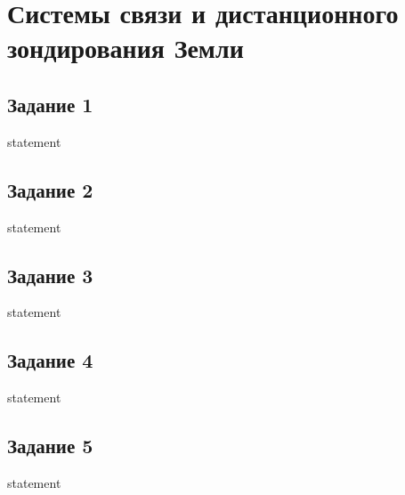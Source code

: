 \chapter{Системы связи и дистанционного зондирования Земли}

\section{Задание 1}

{statement}

\section{Задание 2}
{statement}

\section{Задание 3}

{statement}

\section{Задание 4}

{statement}

\section{Задание 5}

{statement}